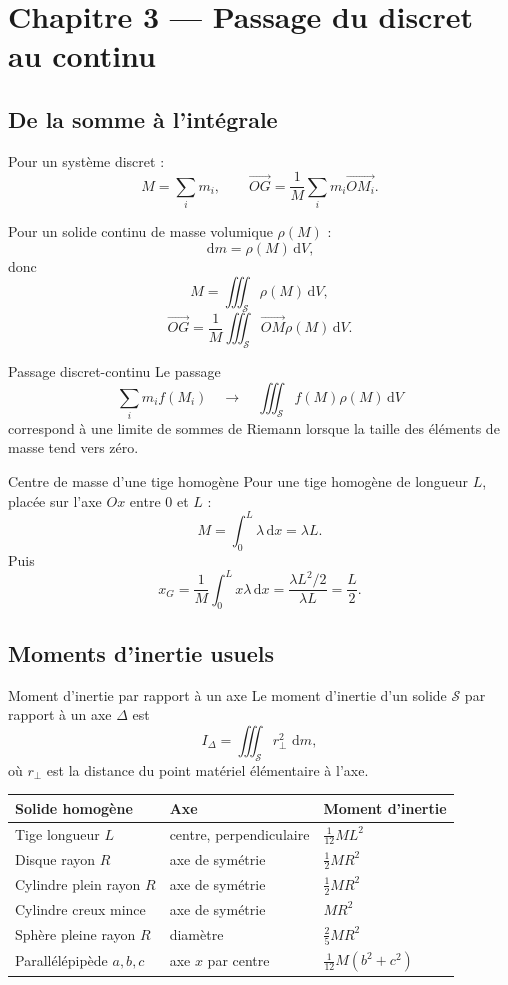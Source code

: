 \documentclass[11pt,a4paper]{article}
\newcommand{\vect}[1]{\overrightarrow{#1}}
\newcommand{\dd}{\,\mathrm{d}}
\newcommand{\Solide}{\mathcal S}
\begin{document}
\section{Chapitre 3 — Passage du discret au continu}

\subsection{De la somme à l'intégrale}

Pour un système discret :
\[
M=\sum_i m_i,
\qquad
\vect{OG}=\frac{1}{M}\sum_i m_i\vect{OM_i}.
\]

Pour un solide continu de masse volumique $\rho(M)$ :
\[
\dd m=\rho(M)\dd V,
\]
donc
\[
M=\iiint_{\Solide}\rho(M)\dd V,
\]
\[
\vect{OG}=\frac{1}{M}\iiint_{\Solide}\vect{OM}\rho(M)\dd V.
\]

\begin{definitionbox}{Passage discret-continu}{}
Le passage
\[
\sum_i m_i f(M_i)
\quad\longrightarrow\quad
\iiint_{\Solide}f(M)\rho(M)\dd V
\]
correspond à une limite de sommes de Riemann lorsque la taille des éléments de masse tend vers zéro.
\end{definitionbox}

\begin{examplebox}{Centre de masse d'une tige homogène}{}
Pour une tige homogène de longueur $L$, placée sur l'axe $Ox$ entre $0$ et $L$ :
\[
M=\int_0^L \lambda \dd x=\lambda L.
\]
Puis
\[
x_G=\frac{1}{M}\int_0^L x\lambda \dd x
=\frac{\lambda L^2/2}{\lambda L}
=\frac L2.
\]
\end{examplebox}

\subsection{Moments d'inertie usuels}

\begin{definitionbox}{Moment d'inertie par rapport à un axe}{}
Le moment d'inertie d'un solide $\Solide$ par rapport à un axe $\Delta$ est
\[
I_\Delta=\iiint_{\Solide} r_\perp^2\,\dd m,
\]
où $r_\perp$ est la distance du point matériel élémentaire à l'axe.
\end{definitionbox}

\begin{center}
\begin{tabular}{lll}
\toprule
Solide homogène & Axe & Moment d'inertie \\
\midrule
Tige longueur $L$ & centre, perpendiculaire & $\frac{1}{12}ML^2$ \\
Disque rayon $R$ & axe de symétrie & $\frac12 MR^2$ \\
Cylindre plein rayon $R$ & axe de symétrie & $\frac12 MR^2$ \\
Cylindre creux mince & axe de symétrie & $MR^2$ \\
Sphère pleine rayon $R$ & diamètre & $\frac25 MR^2$ \\
Parallélépipède $a,b,c$ & axe $x$ par centre & $\frac{1}{12}M(b^2+c^2)$ \\
\bottomrule
\end{tabular}
\end{center}
\end{document}

